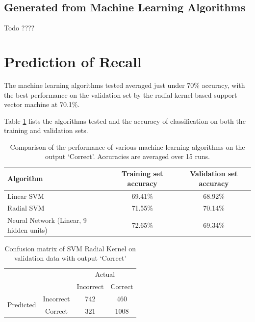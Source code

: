 \subsection*{Generated from Machine Learning Algorithms}
Todo ????

\section{Prediction of Recall}

The machine learning algorithms tested averaged just under 70\% accuracy, with
the best performance on the validation set by the radial kernel based support vector
machine at 70.1\%.

Table \ref{tbl_algo_comparison} lists the algorithms tested and the accuracy of
classification on both the training and validation sets.

\begin{table}[h!]
\caption{Comparison of the performance of various machine learning algorithms on the output `Correct'. Accuracies are averaged over 15 runs.}
\label{tbl_algo_comparison}
\begin{tabular}{|p{5cm}|c|c|}
\hline
Algorithm & Training set accuracy & Validation set accuracy \\
\hline
Linear SVM & 69.41\% & 68.92\% \\
Radial SVM & 71.55\% & 70.14\% \\
Neural Network (Linear, 9 hidden units) & 72.65\% & 69.34\% \\
\hline
\end{tabular}
\end{table}

\begin{table}[h!]
\caption{Confusion matrix of SVM Radial Kernel on validation data with output `Correct'}
\label{tbl_confusionmatrix_correct}
\begin{tabular}{|cc|cc|}
\hline
& & \multicolumn{2}{|c|}{Actual} \\
 & & Incorrect & Correct \\
\hline
\multirow{2}{*}{Predicted} & Incorrect & 742 & 460 \\
& Correct & 321 & 1008 \\
\hline
\end{tabular}
\end{table}

